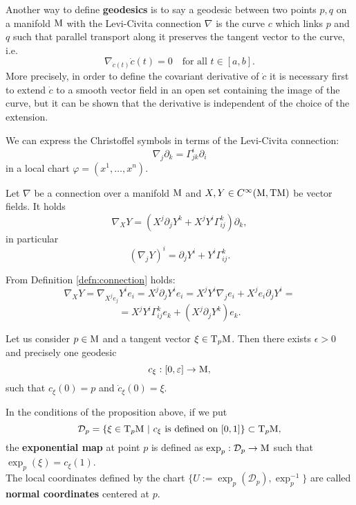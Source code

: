 \noindent Another way to define \textbf{geodesics} is to say a geodesic between two points $p,q$ on a manifold $\mathrm{M}$ with the Levi-Civita connection $\nabla$ is the curve $c$ which links $p$ and $q$ such that parallel transport along it preserves the tangent vector to the curve, i.e.
\begin{equation}
	\nabla_{\dot{c}(t)}\dot{c}(t)=0\quad \text{for all } t\in [a,b].
	\label{eq:LCgeodesic}
\end{equation}
More precisely, in order to define the covariant derivative of $\displaystyle \dot{c}$ it is necessary first to extend $\displaystyle \dot{c}$ to a smooth vector field in an open set containing the image of the curve, but it can be shown that the derivative is independent of the choice of the extension.\\

\begin{oss}
	We can express the Christoffel symbols in terms of the Levi-Civita connection:
	\begin{equation}
			\nabla_{j}\partial_k=\Gamma_{jk}^i \partial_i
			\label{eq:LCchrist}
	\end{equation}
in a local chart $\varphi=(x^1,\dots,x^n)$.
\end{oss}

\begin{prop}
	Let $\nabla$ be a connection over a manifold $\mathrm{M}$ and $X,Y\in C^\infty(\mathrm{M},\mathrm{T}\mathrm{M})$ be vector fields. It holds
	\[	\nabla_X Y=\left(X^j\partial_jY^k+X^jY^i\Gamma_{ij}^k\right)\partial_k,		\]
	in particular
	\[	(\nabla_j Y)^i=\partial_jY^i+Y^i\Gamma_{ij}^k.		\]
\end{prop}
\Proof From Definition \ref{defn:connection} holds:
\[	\nabla_X Y=\nabla_{X^je_j}Y^i e_i=X^j\partial_j Y^i e_i=X^jY^i\nabla_j e_i+X^j e_i\partial_j Y^i=		\]
\[	=X^jY^i\Gamma_{ij}^k e_k+(X^j\partial_jY^k) e_k	.	\]


\begin{prop}
	Let us consider $p\in\mathrm{M}$ and a tangent vector $\xi\in \mathrm{T}_p\mathrm{M}$. Then there exists $\epsilon>0$ and precisely one geodesic $$c_\xi:[0,\varepsilon]\to\mathrm{M},$$ such that $c_\xi(0)=p$ and $\dot c_\xi(0)=\xi$.
\end{prop}

\begin{definition}
	In the conditions of the proposition above, if we put
	\[		\mathcal{D}_p=\{	\xi\in\mathrm{T}_p\mathrm{M}\ |\ c_\xi \text{ is defined on } [0,1]	\}\subset \mathrm{T}_p\mathrm{M},	\]
	the \textbf{exponential map} at point $p$ is defined as $\exp_p:\mathcal{D}_p\to\mathrm{M}$ such that $\exp_p(\xi)=c_\xi(1)$.\\
	The local coordinates defined by the chart $\{U:=\exp_p(\mathcal{D}_p),\exp_p^{-1} \}$ are called \textbf{normal coordinates} centered at $p$.
\end{definition}

